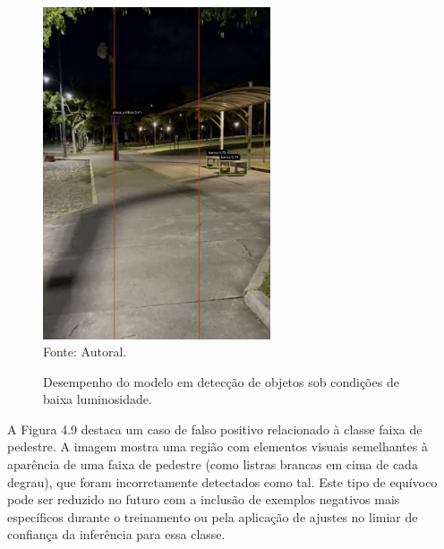 \begin{figure}[htbp]
  \centering
  \caption{Desempenho do modelo em detecção de objetos sob condições de baixa luminosidade.}
  \includegraphics[width=0.6\textwidth]{Figuras/baixa_luminosidade.png}
  \\
  Fonte: Autoral.
  \label{fg-baixa_luminosidade}
\end{figure}

A Figura 4.9 destaca um caso de falso positivo relacionado à classe faixa de pedestre. A imagem mostra uma região com elementos visuais semelhantes à aparência de uma faixa de pedestre (como listras brancas em cima de cada degrau), que foram incorretamente detectados como tal. Este tipo de equívoco pode ser reduzido no futuro com a inclusão de exemplos negativos mais específicos durante o treinamento ou pela aplicação de ajustes no limiar de confiança da inferência para essa classe.

